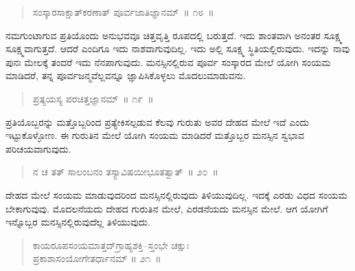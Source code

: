 \begin{verse}
ಸಂಸ್ಕಾರಸಾಕ್ಷಾತ್​ಕರಣಾತ್​ ಪೂರ್ವಜಾತಿಜ್ಞಾನಮ್​~॥ ೧೮~॥
\end{verse}

\vspace{-0.2cm}


\vskip 0.2cm

ನಮಗುಂಟಾಗುವ ಪ್ರತಿಯೊಂದು ಅನುಭವವೂ ಚಿತ್ತವೃತ್ತಿ ರೂಪದಲ್ಲಿ ಬರುತ್ತದೆ. ಇದು ಶಾಂತವಾಗಿ ಅನಂತರ ಸೂಕ್ಷ್ಮ ಸೂಕ್ಷ್ಮವಾಗುತ್ತದೆ. ಆದರೆ ಎಂದಿಗೂ ಇದು ನಾಶವಾಗುವುದಿಲ್ಲ. ಇದು ಅಲ್ಲಿ ಸೂಕ್ಷ್ಮ ಸ್ಥಿತಿಯಲ್ಲಿರುವುದು. ಇದನ್ನು ನಾವು ಪುನಃ ಮೇಲಕ್ಕೆ ತಂದರೆ ಇದು ನೆನಪಾಗುವುದು. ಮನಸ್ಸಿನಲ್ಲಿರುವ ಪೂರ್ವ ಸಂಸ್ಕಾರದ ಮೇಲೆ ಯೋಗಿ ಸಂಯಮ ಮಾಡಿದರೆ, ತನ್ನ ಪೂರ್ವಜನ್ಮವೆಲ್ಲವನ್ನೂ ಜ್ಞಾಪಿಸಿಕೊಳ್ಳಲು ಮೊದಲುಮಾಡುವನು. 

\eject

\begin{verse}
ಪ್ರತ್ಯಯಸ್ಯ ಪರಚಿತ್ತಜ್ಞಾನಮ್​~॥ ೧೯~॥
\end{verse}

\vspace{-0.35cm}



ಪ್ರತಿಯೊಬ್ಬರನ್ನು ಮತ್ತೊಬ್ಬರಿಂದ ಪ್ರತ್ಯೇಕಿಸಲ್ಪಡುವ ಕೆಲವು ಗುರುತು ಅವರ ದೇಹದ ಮೇಲೆ ಇದೆ ಎಂದು ಇಟ್ಟುಕೊಳ್ಳೋಣ. ಈ ಗುರುತಿನ ಮೇಲೆ ಯೋಗಿ ಸಂಯಮ ಮಾಡಿದರೆ ಮತ್ತೊಬ್ಬರ ಮನಸ್ಸಿನ ಸ್ವಭಾವ ಪರಿಚಯವಾಗುವುದು. 

\vspace{-0.3cm}

\begin{verse}
ನ ಚ ತತ್​ ಸಾಲಂಬನಂ ತಸ್ಯಾವಿಷಯೀಭೂತತ್ವಾತ್​~॥ ೨೦~॥
\end{verse}

\vspace{-0.35cm}


ದೇಹದ ಮೇಲೆ ಸಂಯಮ ಮಾಡುವುದರಿಂದ ಮನಸ್ಸಿನಲ್ಲಿರುವುದು ತಿಳಿಯುವುದಿಲ್ಲ. ಇದಕ್ಕೆ ಎರಡು ವಿಧದ ಸಂಯಮ ಬೇಕಾಗುವುವು. ಮೊದಲನೆಯದು ದೇಹದ ಗುರುತಿನ ಮೇಲೆ, ಎರಡನೆಯದು ಮನಸ್ಸಿನ ಮೇಲೆ. ಆಗ ಯೋಗಿಗೆ ಇನ್ನೊಬ್ಬರ ಮನಸ್ಸಿನಲ್ಲಿರುವುದೆಲ್ಲ ತಿಳಿಯುವುದು. 

\vspace{-0.3cm}

\begin{verse}
ಕಾಯರೂಪಸಂಯಮಾತ್ತದ್​ಗ್ರಾಹ್ಯಶಕ್ತಿ–ಸ್ತಂಭೇ ಚಕ್ಷುಃ\\ಪ್ರಕಾಶಾಸಂಯೋಗೇತರ್ಧಾನಮ್​ \hfill{॥ ೨೧~॥}
\end{verse}

